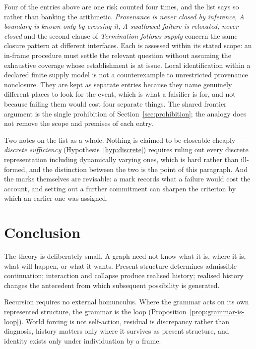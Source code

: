 \documentclass[11pt,a4paper]{article}
\theoremstyle{remark}\newtheorem{remark}[definition]{Remark}
\begin{document}
Four of the entries above are one risk counted four times, and the list says so rather than banking
the arithmetic. \emph{Provenance is never closed by inference}, \emph{A boundary is known only by
crossing it}, \emph{A swallowed failure is relocated, never closed} and the second clause of
\emph{Termination follows supply} concern the same closure pattern at
different interfaces. Each is assessed within its stated scope: an in-frame
procedure must settle the relevant question without assuming the exhaustive
coverage whose establishment is at issue. Local identification within a
declared finite supply model is not a counterexample to unrestricted
provenance nonclosure. They are kept as separate entries because they name genuinely different places to look for the
event, which is what a falsifier is for, and not because failing them would cost four separate
things. The shared frontier argument is the single prohibition of
Section~\ref{sec:prohibition}; the analogy does not remove the scope and
premises of each entry.

Two notes on the list as a whole. Nothing is claimed to be closeable cheaply --- \emph{discrete sufficiency} (Hypothesis~\ref{hyp:discrete}) requires ruling out every discrete representation including dynamically varying ones, which is hard rather than ill-formed, and the distinction between the two is the point of this paragraph. And the marks themselves are revisable: a mark records what a failure would cost the account, and setting out a further commitment can sharpen the criterion by which an earlier one was assigned.

\section{Conclusion}\label{sec:conclusion}
The theory is deliberately small. A graph need not know what it is, where it is, what will happen, or what it wants. Present structure determines admissible continuation; interaction and collapse produce realised history; realised history changes the antecedent from which subsequent possibility is generated.

Recursion requires no external homunculus. Where the grammar acts on its own represented structure, the grammar is the loop (Proposition~\ref{prop:grammar-is-loop}). World forcing is not self-action, residual is discrepancy rather than diagnosis, history matters only where it survives as present structure, and identity exists only under individuation by a frame.
\end{document}
